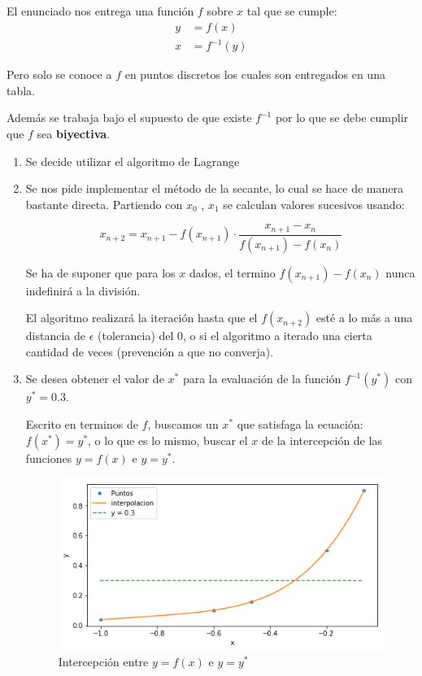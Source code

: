 \documentclass[spanish, fleqn]{article}
\title{Tarea \num\\
       \large Algoritmos y Complejidad\\[3ex]
       \emph{``Tonteando\ldots''}}
\author{Sebastián Bórquez González\\201573015-6}
\date{2018-03-26}
\begin{document}
\maketitle

	El enunciado nos entrega una función $f$ sobre $x$ tal que se cumple:
	\begin{align*}
	y &= f(x)\\
	x &= f^{-1} (y)
	\end{align*}
	
	Pero solo se conoce a $f$ en puntos discretos los cuales son entregados en una tabla.
	
	Además se trabaja bajo el supuesto de que existe $f^{-1}$ por lo que se debe cumplir que $f$ sea \textbf{biyectiva}.	
		
  \begin{enumerate}
  \item %
  Se decide utilizar el algoritmo de Lagrange
  
  \item %
  Se nos pide implementar el método de la secante, lo cual se hace de manera bastante directa. Partiendo con $x_0$ , $x_1$ se calculan valores sucesivos usando:
  
  $$x_{n+2} = x_{n+1} - f(x_{n+1}) \cdot \frac{x_{n+1}-x_{n}}{f(x_{n+1}) - f(x_n)}$$ 
  
  Se ha de suponer que para los $x$ dados, el termino $f(x_{n+1}) - f(x_n)$ nunca indefinirá a la división.
  
  El algoritmo realizará la iteración hasta que  
  el $f(x_{n+2})$ esté a lo más a una distancia de $\epsilon$ (tolerancia) del 0, o si el algoritmo a iterado una cierta cantidad de veces (prevención a que no converja).
  
  \item %
	Se desea obtener el valor de $x^*$ para la evaluación de la función $f^{-1} (y^*)$ con $y^*=0.3$. 
	
	Escrito en terminos de $f$, buscamos un $x^*$ que satisfaga la ecuación: $f(x^*) = y^*$, o lo que es lo mismo, buscar el $x$ de la intercepción de las funciones $y = f(x)$ e $ y = y^*$.
	  
     \begin{figure}[h]
     \caption{Intercepción entre $y=f(x)$ e $y=y^*$}
    \centering 
 	\includegraphics[scale=0.6]{intercepcion.png}
   \end{figure}
	

\end{enumerate}
\end{document}
